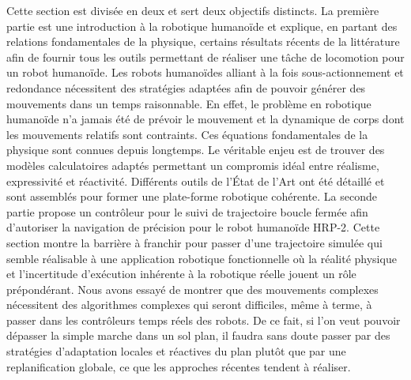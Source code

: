 Cette section est divisée en deux et sert deux objectifs distincts. La
première partie est une introduction à la robotique humanoïde et
explique, en partant des relations fondamentales de la physique,
certains résultats récents de la littérature afin de fournir tous les
outils permettant de réaliser une tâche de locomotion pour un robot
humanoïde. Les robots humanoïdes alliant à la fois sous-actionnement
et redondance nécessitent des stratégies adaptées afin de pouvoir
générer des mouvements dans un temps raisonnable. En effet, le
problème en robotique humanoïde n'a jamais été de prévoir le mouvement
et la dynamique de corps dont les mouvements relatifs sont
contraints. Ces équations fondamentales de la physique sont connues
depuis longtemps. Le véritable enjeu est de trouver des modèles
calculatoires adaptés permettant un compromis idéal entre réalisme,
expressivité et réactivité. Différents outils de l'État de l'Art ont
été détaillé et sont assemblés pour former une plate-forme robotique
cohérente. La seconde partie propose un contrôleur pour le suivi de
trajectoire boucle fermée afin d'autoriser la navigation de précision
pour le robot humanoïde HRP-2. Cette section montre la
barrière à franchir pour passer d'une trajectoire simulée qui semble
réalisable à une application robotique fonctionnelle où la réalité
physique et l'incertitude d'exécution inhérente à la robotique réelle
jouent un rôle prépondérant. Nous avons essayé de montrer que des
mouvements complexes nécessitent des algorithmes complexes qui seront
difficiles, même à terme, à passer dans les contrôleurs temps réels
des robots. De ce fait, si l'on veut pouvoir dépasser la simple marche
dans un sol plan, il faudra sans doute passer par des stratégies
d'adaptation locales et réactives du plan plutôt que par une
replanification globale, ce que les approches récentes tendent à
réaliser.
